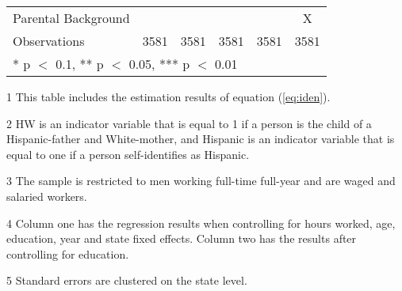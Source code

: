 \begin{table}[H]
\begin{threeparttable}
\begin{tabular}[t]{lccccc}
Parental Background &  &  &  &  & X\\
Observations & \num{3581} & \num{3581} & \num{3581} & \num{3581} & \num{3581}\\
\bottomrule
\multicolumn{6}{l}{\rule{0pt}{1em}* p $<$ 0.1, ** p $<$ 0.05, *** p $<$ 0.01}\\
\end{tabular}
\begin{tablenotes}
\item[1] \footnotesize{This table includes the estimation results of equation (\ref{eq:iden}).}
\item[2] \footnotesize{HW is an indicator variable that is equal to 1 if a person is the child of a Hispanic-father and White-mother, and Hispanic is an indicator variable that is equal to one if a person self-identifies as Hispanic.}
\item[3] \footnotesize{The sample is restricted to men working full-time full-year and are waged and salaried workers.}
\item[4] \footnotesize{Column one has the regression results when controlling for hours worked, age, education, year and state fixed effects. Column two has the results after controlling for education.}
\item[5] {\footnotesize{Standard errors are clustered on the state level.}}
\end{tablenotes}
\end{threeparttable}
\end{table}
